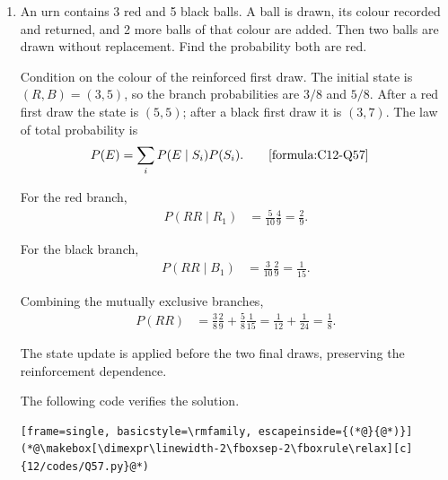 \begin{enumerate}[label=\thesubsection.\arabic*, ref=\thesubsection.\theenumi]
    The following code verifies the solution.

    \begin{lstlisting}[frame=single, basicstyle=\rmfamily, escapeinside={(*@}{@*)}]
(*@\makebox[\dimexpr\linewidth-2\fboxsep-2\fboxrule\relax][c]{12/codes/Q56.py}@*)
    \end{lstlisting}


    \item
    \label{question:C12-Q57}
    \label{question-short:C12-Q57} An urn contains 3 red and 5 black balls. A ball is drawn, its colour recorded and returned, and 2 more balls of that colour are added. Then two balls are drawn without replacement. Find the probability both are red.

    \par
    \smallskip
    \solution

    Condition on the colour of the reinforced first draw. The initial state is $(R,B)=(3,5)$, so the branch probabilities are $3/8$ and $5/8$. After a red first draw the state is $(5,5)$; after a black first draw it is $(3,7)$. The law of total probability is
    \begin{align*}
        P(E) & =\sum_iP(E\mid S_i)P(S_i).
	    \tag*{\eqref{formula:C12-Q57}}
    \end{align*}

    \par
    For the red branch,
    \begin{align*}
        P(RR\mid R_1) & =\frac5{10}\frac4{9}=\frac29.
    \end{align*}

    For the black branch,
    \begin{align*}
        P(RR\mid B_1) & =\frac3{10}\frac2{9}=\frac1{15}.
    \end{align*}

    Combining the mutually exclusive branches,
    \begin{align*}
        P(RR) & =\frac38\frac29+\frac58\frac1{15}
        =\frac1{12}+\frac1{24}=\frac18.
    \end{align*}

    The state update is applied before the two final draws, preserving the reinforcement dependence.

    The following code verifies the solution.

    \begin{lstlisting}[frame=single, basicstyle=\rmfamily, escapeinside={(*@}{@*)}]
(*@\makebox[\dimexpr\linewidth-2\fboxsep-2\fboxrule\relax][c]{12/codes/Q57.py}@*)
    \end{lstlisting}



\end{enumerate}

